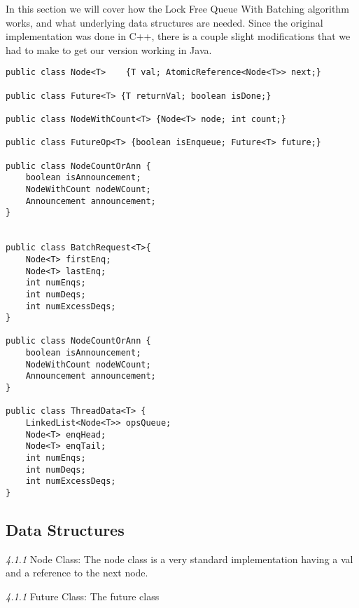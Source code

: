 
\setcounter{subsection}{0}
In this section we will cover how the Lock Free Queue With Batching algorithm works, and what underlying data structures are needed. Since the original implementation was done in C++, there is a couple slight modifications that we had to make to get our version working in Java. 

\begin{lstlisting} 
public class Node<T>    {T val; AtomicReference<Node<T>> next;}

public class Future<T> {T returnVal; boolean isDone;}

public class NodeWithCount<T> {Node<T> node; int count;}

public class FutureOp<T> {boolean isEnqueue; Future<T> future;}

public class NodeCountOrAnn {
    boolean isAnnouncement;
    NodeWithCount nodeWCount;
    Announcement announcement;
}


public class BatchRequest<T>{
    Node<T> firstEnq;
    Node<T> lastEnq;
    int numEnqs;
    int numDeqs;
    int numExcessDeqs;
}

public class NodeCountOrAnn {
    boolean isAnnouncement;
    NodeWithCount nodeWCount;
    Announcement announcement;
}

public class ThreadData<T> {
    LinkedList<Node<T>> opsQueue;
    Node<T> enqHead;
    Node<T> enqTail;
    int numEnqs;
    int numDeqs;
    int numExcessDeqs;
}\end{lstlisting}

\subsection{Data Structures}

\textit{4.1.1} Node Class:
The node class is a very standard implementation having a val and a reference to the next node.\newline

\textit{4.1.1} Future Class: The future class 



